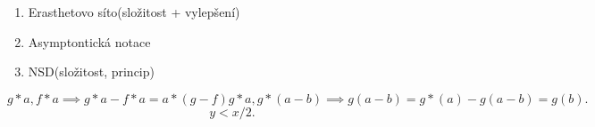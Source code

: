 \documentclass[a4paper]{article}
\begin{document}
    \begin{enumerate}
        \item Erasthetovo síto(složitost + vylepšení)
        \item Asymptontická notace
        \item NSD(složitost, princip)
    \end{enumerate}
\[
    g*a, f*a \implies g*a - f*a = a*(g-f)
    g*a, g*(a-b) \implies g(a-b) = g*(a) - g(a-b) = g(b)
.\]
\[
    y < x/2 

.\] 
\end{document}
